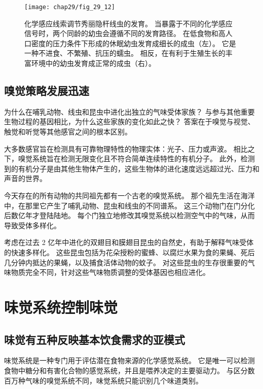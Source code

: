 \begin{figure}[htbp]
	\centering
	\texttt{[image: chap29/fig\_29\_12]}
	\caption{化学感应线索调节秀丽隐杆线虫的发育。
		当暴露于不同的化学感应信号时，两个同龄的幼虫会遵循不同的发育路径。
		在低食物和高人口密度的压力条件下形成的休眠幼虫发育成细长的成虫（左）。
		它是一种不进食、不繁殖、抗压的蠕虫。
		相反，在有利于生殖生长的丰富环境中的幼虫发育成正常的成虫（右）。}
	\label{fig:29_12}
\end{figure}



\subsection{嗅觉策略发展迅速}

为什么在哺乳动物、线虫和昆虫中进化出独立的气味受体家族？
与参与其他重要生物过程的基因相比，为什么这些家族的变化如此之快？
答案在于嗅觉与视觉、触觉和听觉等其他感官之间的根本区别。


大多数感官旨在检测具有可靠物理特性的物理实体：光子、压力或声波。
相比之下，嗅觉系统旨在检测无限变化且不符合简单连续特性的有机分子。
此外，检测到的有机分子是由其他生物体产生的，这些生物体的进化速度远远超过光、压力和声音的世界。


今天存在的所有动物的共同祖先都有一个古老的嗅觉系统。
那个祖先生活在海洋中，在那里它产生了哺乳动物、昆虫和线虫的不同谱系。
这三个动物门在门分化后数亿年才登陆陆地。
每个门独立地修改其嗅觉系统以检测空气中的气味，从而导致受体多样化。


考虑在过去 2 亿年中进化的双翅目和膜翅目昆虫的自然史，有助于解释气味受体的快速多样化。
这些昆虫包括为花朵授粉的蜜蜂、以腐烂水果为食的果蝇、死后几分钟内抵达的果蝇，以及捕食活体动物的蚊子。
对这些昆虫的生存很重要的气味物质完全不同，针对这些气味物质调整的受体基因也相应进化。



\section{味觉系统控制味觉}

\subsection{味觉有五种反映基本饮食需求的亚模式}

味觉系统是一种专门用于评估潜在食物来源的化学感觉系统。
它是唯一可以检测食物中糖分和有害化合物的感觉系统，并且是喂养决定的主要驱动力。
与区分数百万种气味的嗅觉系统不同，味觉系统只能识别几个味道类别。


